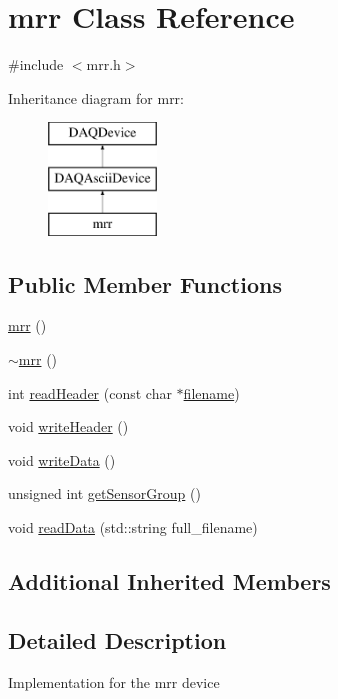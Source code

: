 \hypertarget{classmrr}{\section{mrr Class Reference}
\label{classmrr}
}


{\ttfamily \#include $<$mrr.\-h$>$}

Inheritance diagram for mrr\-:\begin{figure}[H]
\begin{center}
\leavevmode
\includegraphics[height=3.000000cm]{classmrr}
\end{center}
\end{figure}
\subsection*{Public Member Functions}
\begin{DoxyCompactItemize}
\item 
\hyperlink{classmrr_a1a061ae8c23b5d12008f7b14c5eb1346}{mrr} ()
\item 
\hyperlink{classmrr_a2aaef911f158a4ad7922470d91378faf}{$\sim$mrr} ()
\item 
int \hyperlink{classmrr_a594cc3909052919f57881790f094b1fa}{read\-Header} (const char $\ast$\hyperlink{classDAQDevice_a7f9cda7cf5b41f6b134c313477e9644b}{filename})
\item 
void \hyperlink{classmrr_a36a73bcb154bafe4abed5c69c374e96f}{write\-Header} ()
\item 
void \hyperlink{classmrr_a781f21c62e91952f18fef385bcb1be6c}{write\-Data} ()
\item 
unsigned int \hyperlink{classmrr_a830a95365f1abeba05a339d5823cd6ac}{get\-Sensor\-Group} ()
\item 
void \hyperlink{classmrr_a748ac19e38528725bb1794cbd50a1748}{read\-Data} (std\-::string full\-\_\-filename)
\end{DoxyCompactItemize}
\subsection*{Additional Inherited Members}


\subsection{Detailed Description}
Implementation for the mrr device 

